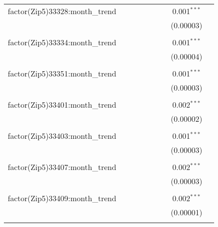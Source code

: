 \begin{table}[H]
{\begin{tabular}{@{\extracolsep{5pt}}lcccccccc}
  factor(Zip5)33328:month\_trend &  &  &  &  &  &  & 0.001$^{***}$ &  \\  

   &  &  &  &  &  &  & (0.00003) &  \\  

   & & & & & & & & \\  

  factor(Zip5)33334:month\_trend &  &  &  &  &  &  & 0.001$^{***}$ &  \\  

   &  &  &  &  &  &  & (0.00004) &  \\  

   & & & & & & & & \\  

  factor(Zip5)33351:month\_trend &  &  &  &  &  &  & 0.001$^{***}$ &  \\  

   &  &  &  &  &  &  & (0.00003) &  \\  

   & & & & & & & & \\  

  factor(Zip5)33401:month\_trend &  &  &  &  &  &  & 0.002$^{***}$ &  \\  

   &  &  &  &  &  &  & (0.00002) &  \\  

   & & & & & & & & \\  

  factor(Zip5)33403:month\_trend &  &  &  &  &  &  & 0.001$^{***}$ &  \\  

   &  &  &  &  &  &  & (0.00003) &  \\  

   & & & & & & & & \\  

  factor(Zip5)33407:month\_trend &  &  &  &  &  &  & 0.002$^{***}$ &  \\  

   &  &  &  &  &  &  & (0.00003) &  \\  

   & & & & & & & & \\  

  factor(Zip5)33409:month\_trend &  &  &  &  &  &  & 0.002$^{***}$ &  \\  

   &  &  &  &  &  &  & (0.00001) &  \\  

   & & & & & & & & \\  


\end{tabular}}
\end{table}
